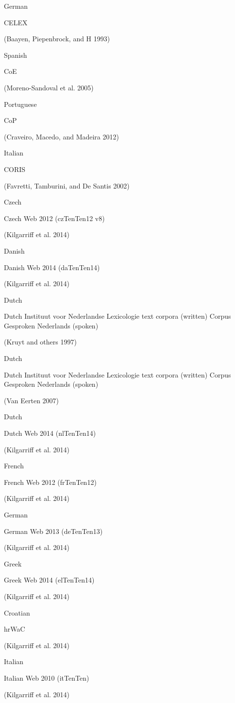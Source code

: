 \documentclass[]{article}
\begin{document}
German

CELEX

(Baayen, Piepenbrock, and H 1993)

Spanish

CoE

(Moreno-Sandoval et al. 2005)

Portuguese

CoP

(Craveiro, Macedo, and Madeira 2012)

Italian

CORIS

(Favretti, Tamburini, and De Santis 2002)

Czech

Czech Web 2012 (czTenTen12 v8)

(Kilgarriff et al. 2014)

Danish

Danish Web 2014 (daTenTen14)

(Kilgarriff et al. 2014)

Dutch

Dutch Instituut voor Nederlandse Lexicologie text corpora (written)
Corpus Gesproken Nederlands (spoken)

(Kruyt and others 1997)

Dutch

Dutch Instituut voor Nederlandse Lexicologie text corpora (written)
Corpus Gesproken Nederlands (spoken)

(Van Eerten 2007)

Dutch

Dutch Web 2014 (nlTenTen14)

(Kilgarriff et al. 2014)

French

French Web 2012 (frTenTen12)

(Kilgarriff et al. 2014)

German

German Web 2013 (deTenTen13)

(Kilgarriff et al. 2014)

Greek

Greek Web 2014 (elTenTen14)

(Kilgarriff et al. 2014)

Croatian

hrWaC

(Kilgarriff et al. 2014)

Italian

Italian Web 2010 (itTenTen)

(Kilgarriff et al. 2014)
\end{document}
